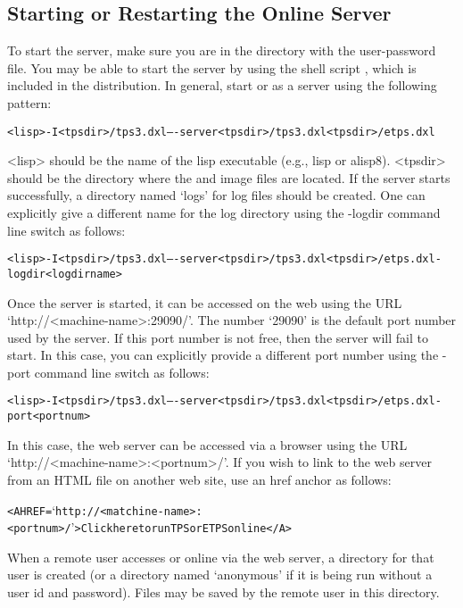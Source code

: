 \subsection{Starting or Restarting the Online Server}

To start the {\TPS} server, make sure you are in the directory
with the user-password file.
You may be able to start the {\TPS} server by using
the shell script , which is included
in the distribution.
In general, start {\TPS}{or {\ETPS}} as a server using the following
pattern:
\begin{alltt}
<lisp> -I <tpsdir>/tps3.dxl -- -server <tpsdir>/tps3.dxl <tpsdir>/etps.dxl
\end{alltt}
<lisp> should be the name of the lisp executable (e.g., lisp or alisp8).
<tpsdir> should be the directory where the {\TPS} and {\ETPS} image files are located.
If the server starts successfully, a directory named `logs' for log files
should be created.  One can explicitly give a different name for the log directory
using the -logdir command line switch as follows:
\begin{alltt}
<lisp> -I <tpsdir>/tps3.dxl -- -server <tpsdir>/tps3.dxl <tpsdir>/etps.dxl -logdir <logdirname>
\end{alltt}

Once the server is started, it can be accessed on the web using the URL
`http://<machine-name>:29090/'.  The number `29090' is the default
port number used by the {\TPS} server.  If this port number is not free,
then the {\TPS} server will fail to start.  In this case, you can
explicitly provide a different port number using the -port command line
switch as follows:
\begin{alltt}
<lisp> -I <tpsdir>/tps3.dxl -- -server <tpsdir>/tps3.dxl <tpsdir>/etps.dxl -port <portnum>
\end{alltt}
In this case, the {\TPS} web server can be accessed via a browser using
the URL `http://<machine-name>:<portnum>/'.  If you wish to link to
the web server from an HTML file on another web site, use an href anchor
as follows:
\begin{alltt}
<A HREF=`http://<matchine-name>:<portnum>/'>Click here to run TPS or ETPS online</A>
\end{alltt}

When a remote user accesses {\TPS} or {\ETPS} online via the {\TPS} web server,
a directory for that user is created (or a directory named `anonymous' if it is being
run without a user id and password).  Files may be saved by the remote user
in this directory.

